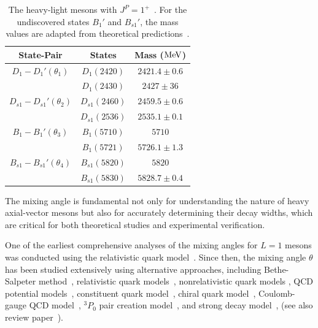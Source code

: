 \documentclass[prd,a4paper,preprint,preprintnumbers,nofootinbib,superscriptaddress]{revtex4-2}
\begin{document}
\begin{table}[h!]
\centering
\begin{tabular}{ccc}
\toprule
\textbf{State-Pair}  & \textbf{States} & \textbf{Mass ($\rm{MeV}$)} \\
\midrule
\(D_{1} - D_{1}' ( \theta_1)\)    & \(D_1(2420)\)            & $2421.4 \pm 0.6$             \\
                     & \(D_1(2430)\)           & $2427  \pm 36$               \\
  \midrule
\(D_{s1} - D_{s1}' ( \theta_2) \) & \(D_{s1}(2460)\)    & $2459.5 \pm 0.6$                   \\
                     & \(D_{s1}(2536)\)  & $2535.1 \pm 0.1$                     \\
\midrule
  \(B_{1} - B_{1}' ( \theta_3)\) & \(B_1(5710)\)       &   $5710 $                   \\
                     & \(B_1(5721) \)             &    $5726.1 \pm 1.3$                   \\
  \midrule
\(B_{s1} - B_{s1}' ( \theta_4) \) & \(B_{s1} (5820)\)    &  $5820$                    \\
                     & \(B_{s1} (5830) \)       & $5828.7 \pm 0.4$                         \\
\bottomrule
\end{tabular}
\caption{The heavy-light mesons with $J^P = 1^+$~\cite{ParticleDataGroup:2022pth}. For the undiscovered states \(B_1'\) and \(B_{s1}'\), the mass values are adapted from theoretical predictions~\cite{li:2021hss}.}
\label{tab:particles}
\end{table}

The mixing angle is fundamental not only for understanding the nature of heavy axial-vector mesons but also for accurately determining their decay widths, which are critical for both theoretical studies and experimental verification.

One of the earliest comprehensive analyses of the mixing angles for $L=1$ mesons was conducted using the relativistic quark model~\cite{Godfrey:1986wj}. Since then, the mixing angle $\theta$ has been studied extensively using alternative approaches, including Bethe-Salpeter method~\cite{Godfrey:2015dva}, relativistic quark models~\cite{Godfrey:1986wj,Godfrey:2016nwn,Wang:2022tuy,Li:2018eqc,Sun:2014wea}, nonrelativistic quark models \cite{Lu:2016bbk, li:2021hss}, QCD potential models~\cite{Gupta:1994mw}, constituent quark model~\cite{Vijande:2004he,Yamada:2005nu}, chiral quark model~\cite{Zhong:2008kd}, Coulomb-gauge QCD model~\cite{Abreu:2019adi}, $^3P_0$ pair creation model~\cite{Ferretti:2015rsa}, and strong decay model~\cite{Close:2005se},  (see also review paper~\cite{Chen:2016spr}).
\end{document}
